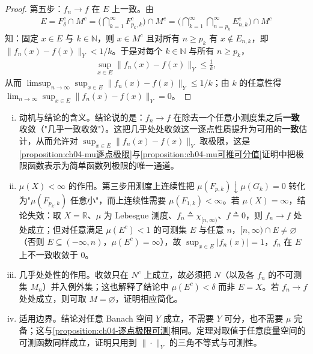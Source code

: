 \documentclass[../../main.tex]{subfiles}%
\begin{document}
\begin{proof}
第五步：$f_n\to f$ 在 $E$ 上一致。由
\begin{align*}
E=F_\delta^c\cap M^c=\Big(\bigcap_{k=1}^\infty F_{p_k,k}^c\Big)\cap M^c=\Big(\bigcap_{k=1}^\infty\bigcap_{n=p_k}^\infty E_{n,k}^c\Big)\cap M^c
\end{align*}
知：固定 $x\in E$ 与 $k\in\mathbb{N}$，则 $x\in M^c$ 且对所有 $n\geqslant p_k$ 有 $x\notin E_{n,k}$，即 $\|f_n(x)-f(x)\|_Y<1/k$。于是对每个 $k\in\mathbb{N}$ 与所有 $n\geqslant p_k$，
\begin{align*}
\sup_{x\in E}\|f_n(x)-f(x)\|_Y\leqslant\frac1k,
\end{align*}
从而 $\limsup_{n\to\infty}\sup_{x\in E}\|f_n(x)-f(x)\|_Y\leqslant1/k$；由 $k$ 的任意性得 $\lim_{n\to\infty}\sup_{x\in E}\|f_n(x)-f(x)\|_Y=0$。
\end{proof}

\begin{remark}\label{remark:ch04-Egorov动机}
\begin{enumerate}[(i)]
\item 动机与结论的含义。结论说的是：$f_n\to f$ 在除去一个任意小测度集之后\textbf{一致}收敛（"几乎一致收敛"）。这把几乎处处收敛这一逐点性质提升为可用的\textbf{一致}估计，从而允许对 $\sup_{x\in E}\|f_n(x)-f(x)\|_Y$ 取极限，这是\cref{proposition:ch04-mu逐点极限}与\cref{proposition:ch04-mu可推可分值}证明中把极限函数表示为简单函数列极限的唯一通道。
\item $\mu(X)<\infty$ 的作用。第三步用测度上连续性把 $\mu(F_{p,k})\downarrow\mu(G_k)=0$ 转化为"$\mu(F_{p_k,k})$ 任意小"，而上连续性需要 $\mu(F_{1,k})<\infty$。若 $\mu(X)=\infty$，结论失效：取 $X=\mathbb{R}$、$\mu$ 为 Lebesgue 测度、$f_n\triangleq\chi_{[n,\infty)}$、$f\triangleq0$，则 $f_n\to f$ 处处成立；但对任意满足 $\mu(E^c)<1$ 的可测集 $E$ 与任意 $n$，$[n,\infty)\cap E\neq\varnothing$（否则 $E\subseteq(-\infty,n)$，$\mu(E^c)=\infty$），故 $\sup_{x\in E}|f_n(x)|=1$，$f_n$ 在 $E$ 上不一致收敛于 $0$。
\item 几乎处处性的作用。收敛只在 $N^c$ 上成立，故必须把 $N$（以及各 $f_n$ 的不可测集 $M_n$）并入例外集；这也解释了结论中 $\mu(E^c)<\delta$ 而非 $E=X$。若 $f_n\to f$ 处处成立，则可取 $M=\varnothing$，证明相应简化。
\item 适用边界。结论对任意 Banach 空间 $Y$ 成立，不需要 $Y$ 可分，也不需要 $\mu$ 完备；这与\cref{proposition:ch04-逐点极限可测}相同。定理对取值于任意度量空间的可测函数同样成立，证明只用到 $\|\cdot\|_Y$ 的三角不等式与可测性。
\end{enumerate}
\end{remark}
\end{document}
